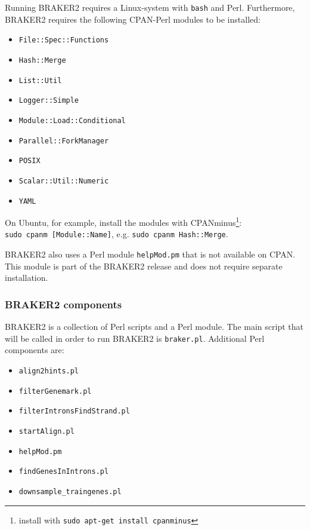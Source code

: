 \documentclass[]{article}
\begin{document}
Running BRAKER2 requires a Linux-system with \texttt{bash} and Perl.
Furthermore, BRAKER2 requires the following CPAN-Perl modules to be
installed:

\begin{itemize}
\item
  \texttt{File::Spec::Functions}
\item
  \texttt{Hash::Merge}
\item
  \texttt{List::Util}
\item
  \texttt{Logger::Simple}
\item
  \texttt{Module::Load::Conditional}
\item
  \texttt{Parallel::ForkManager}
\item
  \texttt{POSIX}
\item
  \texttt{Scalar::Util::Numeric}
\item
  \texttt{YAML}
\end{itemize}

On Ubuntu, for example, install the modules with CPANminus\footnote{install
  with \texttt{sudo\ apt-get\ install\ cpanminus}}:
\texttt{sudo\ cpanm\ {[}Module::Name{]}}, e.g.
\texttt{sudo\ cpanm\ Hash::Merge}.

BRAKER2 also uses a Perl module \texttt{helpMod.pm} that is not
available on CPAN. This module is part of the BRAKER2 release and does
not require separate installation.

\hypertarget{Executability}{\subsubsection{BRAKER2
components}\label{Executability}}

BRAKER2 is a collection of Perl scripts and a Perl module. The main
script that will be called in order to run BRAKER2 is
\texttt{braker.pl}. Additional Perl components are:

\begin{itemize}
\item
  \texttt{align2hints.pl}
\item
  \texttt{filterGenemark.pl}
\item
  \texttt{filterIntronsFindStrand.pl}
\item
  \texttt{startAlign.pl}
\item
  \texttt{helpMod.pm}
\item
  \texttt{findGenesInIntrons.pl}
\item
  \texttt{downsample\_traingenes.pl}
\end{itemize}
\end{document}
